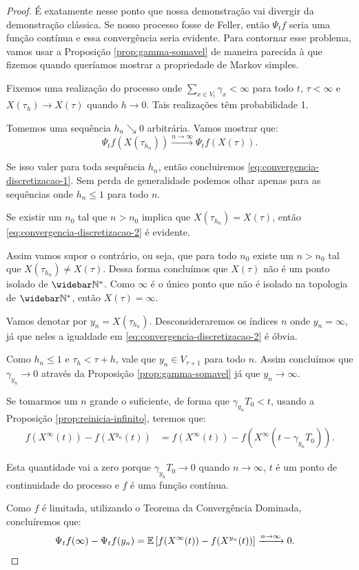 \begin{proof}
  É exatamente nesse ponto que nossa demonstração vai divergir da
  demonstração clássica. Se nosso processo fosse de Feller, então
  $\Psi_t f$ seria uma função contínua e essa convergência seria
  evidente. Para contornar esse problema, vamos usar a Proposição
  \ref{prop:gamma-somavel} de maneira parecida à que fizemos quando
  queríamos mostrar a propriedade de Markov simples.

  Fixemos uma realização do processo onde $\sum_{x \in V_t} \gamma_x <
  \infty$ para todo $t$, $\tau < \infty$ e $X(\tau_{h}) \to X(\tau)$
  quando $h \to 0$. Tais realizações têm probabilidade 1.


  Tomemos uma sequência $h_n \searrow 0$ arbitrária. Vamos mostrar que:
  \begin{equation}
    \label{eq:convergencia-discretizacao-2}
    \Psi_t f (X(\tau_{h_n})) \xrightarrow{n \to \infty}
    \Psi_t f(X(\tau)).
  \end{equation}

  Se isso valer para toda sequência $h_n$, então concluiremos
  \eqref{eq:convergencia-discretizacao-1}. Sem perda de generalidade
  podemos olhar apenas para as sequências onde $h_n \leq 1$ para todo
  $n$.

  Se existir um $n_0$ tal que $n > n_0$ implica que $X(\tau_{h_n}) =
  X(\tau)$, então \eqref{eq:convergencia-discretizacao-2} é evidente.

  Assim vamos supor o contrário, ou seja, que para todo $n_0$ existe
  um $n > n_0$ tal que $X(\tau_{h_n}) \neq X(\tau)$. Dessa forma
  concluímos que $X(\tau)$ não é um ponto isolado de $\Nzb$. Como
  $\infty$ é o único ponto que não é isolado na topologia de $\Nzb$,
  então $X(\tau) = \infty$.

  Vamos denotar por $y_n = X(\tau_{h_n})$. Desconsideraremos os
  índices $n$ onde $y_n = \infty$, já que neles a igualdade em
  \eqref{eq:convergencia-discretizacao-2} é óbvia.

  Como $h_n \leq 1$ e $\tau_h < \tau + h$, vale que $y_n \in V_{\tau +
    1}$ para todo $n$.  Assim concluímos que $\gamma_{y_n} \to 0$
  através da Proposição \ref{prop:gamma-somavel} já que $y_n \to
  \infty$.

  Se tomarmos um $n$ grande o suficiente, de forma que $\gamma_{y_n}
  T_0 < t$, usando a Proposição \ref{prop:reinicia-infinito}, teremos
  que:
  \begin{align*}
    f(X^{\infty}(t)) - f(X^{y_n}(t)) &=
    f(X^{\infty}(t)) - f(X^{\infty}(t-\gamma_{y_n} T_0)).
  \end{align*}

  Esta quantidade vai a zero \qc porque $\gamma_{y_n} T_0 \to 0$
  \qc quando $n \to \infty$, $t$ é \qc um ponto de continuidade do
  processo e $f$ é uma função contínua.

  Como $f$ é limitada, utilizando o Teorema da Convergência Dominada,
  concluíremos que:
  \begin{align*}
    \Psi_t f(\infty) - \Psi_t f (y_n)
    &= {\mathbb{E}} \left[
      f(X^{\infty}(t)) - f(X^{y_n}(t))
    \right] \xrightarrow{n \to \infty} 0.
    \qedhere
  \end{align*}
\end{proof}



